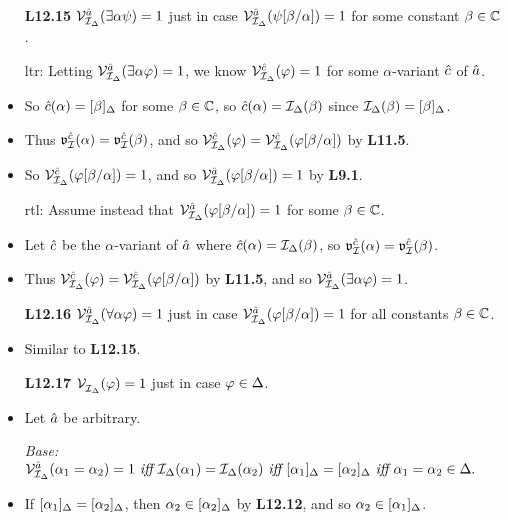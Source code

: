 \documentclass[a4paper, 11pt]{article} %
\begin{document}
\begin{itemize}
  \item[\bf L12.15] $\mathcal{V}_{\mathcal{I}_{\Delta}}^{\hat{a}}(\exists \alpha\psi)=1$ just in case $\mathcal{V}_{\mathcal{I}_{\Delta}}^{\hat{a}}(\psi[\beta/\alpha])=1$ for some constant $\beta\in\mathbb{C}$.
  \item[\sc ltr:] Letting $\mathcal{V}_{\mathcal{I}_{\Delta}}^{\hat{a}}(\exists \alpha\varphi)=1$, we know $\mathcal{V}_{\mathcal{I}_{\Delta}}^{\hat{c}}(\varphi)=1$ for some $\alpha$-variant $\hat{c}$ of $\hat{a}$.
  \item So $\hat{c}(\alpha)=[\beta]_{\Delta}$ for some $\beta\in\mathbb{C}$, so $\hat{c}(\alpha)=\mathcal{I}_{\Delta}(\beta)$ since $\mathcal{I}_{\Delta}(\beta)=[\beta]_{\Delta}$.
  \item Thus $\mathfrak{v}_{\mathcal{I}}^{\hat{c}}(\alpha)=\mathfrak{v}_{\mathcal{I}}^{\hat{c}}(\beta)$, and so $\mathcal{V}_{\mathcal{I}_{\Delta}}^{\hat{c}}(\varphi)=\mathcal{V}_{\mathcal{I}_{\Delta}}^{\hat{c}}(\varphi[\beta/\alpha])$ by \textbf{L11.5}.
  \item So $\mathcal{V}_{\mathcal{I}_{\Delta}}^{\hat{c}}(\varphi[\beta/\alpha])=1$, and so $\mathcal{V}_{\mathcal{I}_{\Delta}}^{\hat{a}}(\varphi[\beta/\alpha])=1$ by \textbf{L9.1}.
  \item[\sc rtl:] Assume instead that $\mathcal{V}_{\mathcal{I}_{\Delta}}^{\hat{a}}(\varphi[\beta/\alpha])=1$ for some $\beta\in\mathbb{C}$.
  \item Let $\hat{c}$ be the $\alpha$-variant of $\hat{a}$ where $\hat{c}(\alpha)=\mathcal{I}_{\Delta}(\beta)$, so $\mathfrak{v}_{\mathcal{I}}^{\hat{c}}(\alpha)=\mathfrak{v}_{\mathcal{I}}^{\hat{c}}(\beta)$.
  \item Thus $\mathcal{V}_{\mathcal{I}_{\Delta}}^{\hat{c}}(\varphi)=\mathcal{V}_{\mathcal{I}_{\Delta}}^{\hat{c}}(\varphi[\beta/\alpha])$ by \textbf{L11.5}, and so $\mathcal{V}_{\mathcal{I}_{\Delta}}^{\hat{a}}(\exists \alpha\varphi)=1$.
  \item[\bf L12.16] $\mathcal{V}_{\mathcal{I}_{\Delta}}^{\hat{a}}(\forall \alpha\varphi)=1$ just in case $\mathcal{V}_{\mathcal{I}_{\Delta}}^{\hat{a}}(\varphi[\beta/\alpha])=1$ for all constants $\beta\in\mathbb{C}$.
    \setcounter{enumi}{0}
  \item Similar to \textbf{L12.15}.
  \item[\bf L12.17] $\mathcal{V}_{\mathcal{I}_{\Delta}}^{}(\varphi)=1$ just in case $\varphi\in\Delta$.
    \item Let $\hat{a}$ be arbitrary.
  \item[\it Base:] 
    $\mathcal{V}_{\mathcal{I}_{\Delta}}^{\hat{a}}(\alpha_1=\alpha_2)=1
      \textit{ iff } \mathcal{I}_{\Delta}(\alpha_1)=\mathcal{I}_{\Delta}(\alpha_2)
      \textit{ iff } [\alpha_1]_{\Delta}=[\alpha_2]_{\Delta}
      \textit{ iff } \alpha_1=\alpha_2\in\Delta.$
    \item If $[\alpha_1]_{\Delta}=[\alpha_2]_{\Delta}$, then $\alpha_2\in[\alpha_2]_{\Delta}$ by \textbf{L12.12}, and so $\alpha_2\in[\alpha_1]_{\Delta}$.

\end{itemize}
\end{document}
